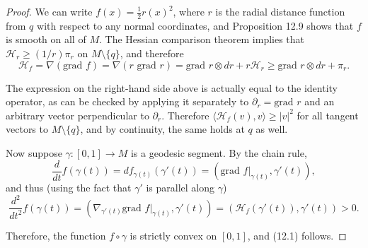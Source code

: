 \begin{proof}
We can write $f(x) = \frac{1}{2}r(x)^2$, where $r$ is the radial distance function from $q$ with respect to any normal coordinates, and Proposition 12.9 shows that $f$ is smooth on all of $M$. The Hessian comparison theorem implies that $\mathcal{H}_r \geq (1/r)\pi_r$ on $M \setminus \{q\}$, and therefore
\[
\mathcal{H}_f = \nabla(\text{grad } f) = \nabla(r \text{ grad } r) = \text{grad } r \otimes dr + r\mathcal{H}_r \geq \text{grad } r \otimes dr + \pi_r.
\]

The expression on the right-hand side above is actually equal to the identity operator, as can be checked by applying it separately to $\partial_r = \text{grad } r$ and an arbitrary vector perpendicular to $\partial_r$. Therefore $\langle \mathcal{H}_f(v), v \rangle \geq |v|^2$ for all tangent vectors to $M \setminus \{q\}$, and by continuity, the same holds at $q$ as well.

Now suppose $\gamma : [0,1] \to M$ is a geodesic segment. By the chain rule,
\[
\frac{d}{dt} f(\gamma(t)) = df_{\gamma(t)}(\gamma'(t)) = (\text{grad } f|_{\gamma(t)}, \gamma'(t)),
\]
and thus (using the fact that $\gamma'$ is parallel along $\gamma$)
\[
\frac{d^2}{dt^2} f(\gamma(t)) = (\nabla_{\gamma'(t)} \text{grad } f|_{\gamma(t)}, \gamma'(t)) = (\mathcal{H}_f(\gamma'(t)), \gamma'(t)) > 0.
\]

Therefore, the function $f \circ \gamma$ is strictly convex on $[0, 1]$, and (12.1) follows.
\end{proof}


